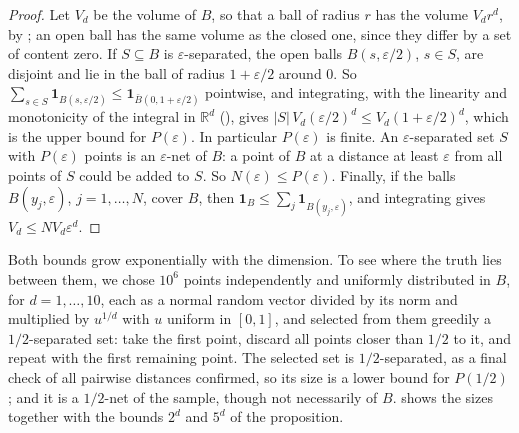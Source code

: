 \begin{proof}
Let $V_d$ be the volume of $B$, so that a ball of radius $r$ has the volume $V_dr^d$, by ; an open ball has the same volume as the closed one, since they differ by a set of content zero. If $S\subseteq B$ is $\varepsilon$-separated, the open balls $B(s,\varepsilon/2)$, $s\in S$, are disjoint and lie in the ball of radius $1+\varepsilon/2$ around $0$. So $\sum_{s\in S}\mathbf 1_{B(s,\varepsilon/2)}\le\mathbf 1_{\bar B(0,1+\varepsilon/2)}$ pointwise, and integrating, with the linearity and monotonicity of the integral in $\mathbb R^d$ (), gives $|S|\,V_d(\varepsilon/2)^d\le V_d(1+\varepsilon/2)^d$, which is the upper bound for $P(\varepsilon)$. In particular $P(\varepsilon)$ is finite. An $\varepsilon$-separated set $S$ with $P(\varepsilon)$ points is an $\varepsilon$-net of $B$: a point of $B$ at a distance at least $\varepsilon$ from all points of $S$ could be added to $S$. So $N(\varepsilon)\le P(\varepsilon)$. Finally, if the balls $B(y_j,\varepsilon)$, $j=1,\ldots,N$, cover $B$, then $\mathbf 1_B\le\sum_j\mathbf 1_{B(y_j,\varepsilon)}$, and integrating gives $V_d\le NV_d\varepsilon^d$.
\end{proof}

Both bounds grow exponentially with the dimension. To see where the truth lies between them, we chose $10^6$ points independently and uniformly distributed in $B$, for $d=1,\ldots,10$, each as a normal random vector divided by its norm and multiplied by $u^{1/d}$ with $u$ uniform in $[0,1]$, and selected from them greedily a $1/2$-separated set: take the first point, discard all points closer than $1/2$ to it, and repeat with the first remaining point. The selected set is $1/2$-separated, as a final check of all pairwise distances confirmed, so its size is a lower bound for $P(1/2)$; and it is a $1/2$-net of the sample, though not necessarily of $B$.  shows the sizes together with the bounds $2^d$ and $5^d$ of the proposition.

